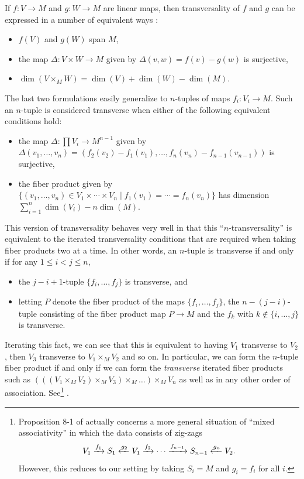 \begin{remark}
\begin{remark}
	If $f \colon V\to M$ and $g \colon W\to M$ are linear maps, then transversality of $f$ and $g$ can be expressed in a number of equivalent ways \cite[Section 4.7]{RamBas09}:
	\begin{itemize}
		\item $f(V)$ and $g(W)$ span $M$,
		\item the map $\Delta \colon V\times W\to M$ given by $\Delta(v,w)=f(v)-g(w)$ is surjective,
		\item $\dim(V\times_MW)=\dim(V)+\dim(W)-\dim(M)$.
	\end{itemize}
	The last two formulations easily generalize to $n$-tuples of maps $f_i \colon V_i\to M$.
	Such an $n$-tuple is considered transverse when either of the following equivalent conditions hold:
	\begin{itemize}
		\item the map $\Delta \colon \prod V_i\to M^{n-1}$ given by $\Delta(v_1,\ldots,v_n)=(f_2(v_2)-f_1(v_1),\ldots, f_n(v_n)-f_{n-1}(v_{n-1}))$ is surjective,
		\item the fiber product given by $\{(v_1,\ldots,v_n)\in V_1\times\cdots \times V_n\mid f_1(v_1)=\cdots=f_n(v_n)\}$ has dimension $\sum_{i=1}^n\dim(V_i) -n\dim(M)$.
	\end{itemize}
	This version of transversality behaves very well in that this ``$n$-transversality'' is equivalent to the iterated transversality conditions that are required when taking fiber products two at a time.
	In other words, an $n$-tuple is transverse if and only if for any $1\leq i<j\leq n$,
	\begin{itemize}
		\item the $j-i+1$-tuple $\{f_i,\ldots,f_j\}$ is transverse, and
		\item letting $P$ denote the fiber product of the maps $\{f_i,\ldots,f_j\}$, the $n-(j-i)$-tuple consisting of the fiber product map $P\to M$ and the $f_k$ with $k\notin\{i,\ldots,j\}$ is transverse.
	\end{itemize}
	Iterating this fact, we can see that this is equivalent to having $V_1$ transverse to $V_2$, then $V_3$ transverse to $V_1\times_MV_2$ and so on.
	In particular, we can form the $n$-tuple fiber product if and only if we can form the {\it transverse} iterated fiber products such as $(((V_1\times_MV_2)\times_M V_3)\times_M\ldots)\times_M V_n$ as well as in any other order of association.
 	See\footnote{Proposition 8-1 of \cite{RamBas09} actually concerns a more general situation of ``mixed associativity'' in which the data consists of zig-zags
	$$V_1\xrightarrow{f_1}S_1\xleftarrow{g_2}V_1\xrightarrow{f_2}\cdots\xrightarrow{f_{n-1}}S_{n-1}\xleftarrow{g_n}V_2.$$
	However, this reduces to our setting by taking $S_i=M$ and $g_i=f_i$ for all $i$.} \cite[Proposition~8-1]{RamBas09}.


\end{remark}
\end{remark}
